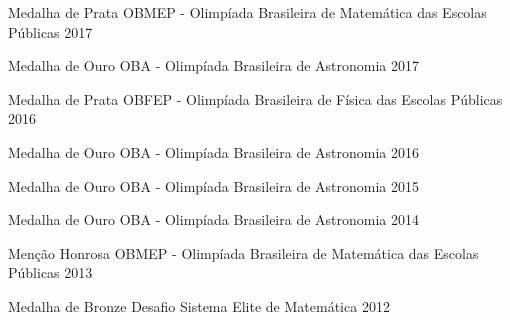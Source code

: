 

\begin{cvhonors}

  \cvhonor
    {Medalha de Prata} %
    {OBMEP - Olimpíada Brasileira de Matemática das Escolas Públicas} %
    {} %
    {2017} %

  \cvhonor
    {Medalha de Ouro} %
    {OBA - Olimpíada Brasileira de Astronomia} %
    {} %
    {2017} %

  \cvhonor
    {Medalha de Prata} %
    {OBFEP - Olimpíada Brasileira de Física das Escolas Públicas} %
    {} %
    {2016} %

  \cvhonor
    {Medalha de Ouro} %
    {OBA - Olimpíada Brasileira de Astronomia} %
    {} %
    {2016} %

  \cvhonor
    {Medalha de Ouro} %
    {OBA - Olimpíada Brasileira de Astronomia} %
    {} %
    {2015} %

  \cvhonor
    {Medalha de Ouro} %
    {OBA - Olimpíada Brasileira de Astronomia} %
    {} %
    {2014} %

  \cvhonor
    {Menção Honrosa} %
    {OBMEP - Olimpíada Brasileira de Matemática das Escolas Públicas} %
    {} %
    {2013} %

  \cvhonor
    {Medalha de Bronze} %
    {Desafio Sistema Elite de Matemática} %
    {} %
    {2012} %

\end{cvhonors}
